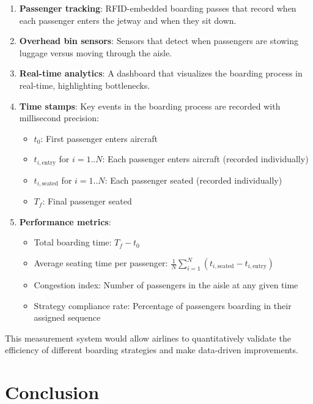 \documentclass[12pt]{article}
\begin{document}
\begin{enumerate}
    \item \textbf{Passenger tracking}: RFID-embedded boarding passes that record when each passenger enters the jetway and when they sit down.
    
    \item \textbf{Overhead bin sensors}: Sensors that detect when passengers are stowing luggage versus moving through the aisle.
    
    \item \textbf{Real-time analytics}: A dashboard that visualizes the boarding process in real-time, highlighting bottlenecks.
    
    \item \textbf{Time stamps}: Key events in the boarding process are recorded with millisecond precision:
    \begin{itemize}
        \item $t_0$: First passenger enters aircraft
        \item $t_{i,\text{entry}}$ for $i=1..N$: Each passenger enters aircraft (recorded individually)
        \item $t_{i,\text{seated}}$ for $i=1..N$: Each passenger seated (recorded individually)
        \item $T_f$: Final passenger seated
    \end{itemize}
    
    \item \textbf{Performance metrics}: 
    \begin{itemize}
        \item Total boarding time: $T_f - t_0$
        \item Average seating time per passenger: $\frac{1}{N}\sum_{i=1}^N (t_{i,\text{seated}} - t_{i,\text{entry}})$
        \item Congestion index: Number of passengers in the aisle at any given time
        \item Strategy compliance rate: Percentage of passengers boarding in their assigned sequence
    \end{itemize}
\end{enumerate}

This measurement system would allow airlines to quantitatively validate the efficiency of different boarding strategies and make data-driven improvements.

\section{Conclusion}
\end{document}
